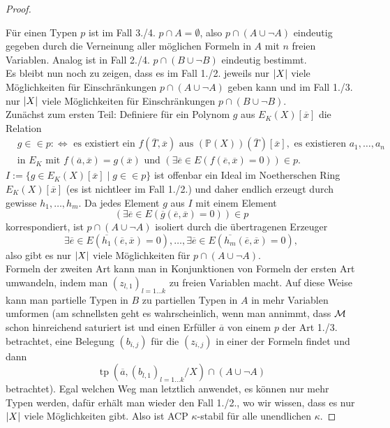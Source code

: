 \begin{proof}
\begin{enumerate}
	\end{enumerate}\newpage
	Für einen Typen $p$ ist im Fall 3./4. $p\cap A=\emptyset$, also $p\cap(A\cup\neg A)$ eindeutig gegeben durch die Verneinung aller möglichen Formeln in $A$ mit $n$ freien Variablen. Analog ist in Fall 2./4. $p\cap(B\cup\neg B)$ eindeutig bestimmt.\\
	Es bleibt nun noch zu zeigen, dass es im Fall 1./2. jeweils nur ${\left| X \right|}$ viele Möglichkeiten für Einschränkungen $p\cap(A\cup\neg A)$ geben kann und im Fall 1./3. nur ${\left| X \right|}$ viele Möglichkeiten für Einschränkungen $p\cap(B\cup\neg B)$.\\
	Zunächst zum ersten Teil: Definiere für ein Polynom $g$ aus $E_K(X)[\overline{x}]$ die Relation
	\begin{align*}&g\in\in p:\Leftrightarrow\text{ es existiert ein }f(\overline{T},\overline{x})\text{ aus }(\mathbb{P}(X))(\overline{T})[\overline{x}],\text{ es existieren }a_1,\dots,a_n\\
	&\text{in }E_K\text{ mit }f(\overline{a},\overline{x})=g(\overline{x})\text{ und }\left(\exists\overline{e}\in E(f(\overline{e},\overline{x})=0)\right)\in p.
	\end{align*}
	$I:=\{g\in E_K(X)[\overline{x}]\mid g\in\in p\}$ ist offenbar ein Ideal im Noetherschen Ring $E_K(X)[\overline{x}]$ (es ist nichtleer im Fall 1./2.) und daher endlich erzeugt durch gewisse $h_1,\dots,h_m$. Da jedes Element $g$ aus $I$ mit einem Element $$\left(\exists\overline{e}\in E(\overline{g}(\overline{e},\overline{x})=0)\right)\in p$$ korrespondiert, ist $p\cap(A\cup\neg A)$ isoliert durch die übertragenen Erzeuger $$\exists\overline{e}\in E(\overline{h_1}(\overline{e},\overline{x})=0),\dots,\exists\overline{e}\in E(\overline{h_m}(\overline{e},\overline{x})=0),$$ also gibt es nur ${\left| X \right|}$ viele Möglichkeiten für $p\cap(A\cup\neg A)$.\\
	Formeln der zweiten Art kann man in Konjunktionen von Formeln der ersten Art umwandeln, indem man $(z_{l,1})_{l=1\dots k}$ zu freien Variablen macht. Auf diese Weise kann man partielle Typen in $B$ zu partiellen Typen in $A$ in mehr Variablen umformen (am schnellsten geht es wahrscheinlich, wenn man annimmt, dass $\mathcal{M}$ schon hinreichend saturiert ist und einen Erfüller $\overline{a}$ von einem $p$ der Art 1./3. betrachtet, eine Belegung $(b_{i,j})$ für die $(z_{i,j})$ in einer der Formeln findet und dann $$\operatorname{tp}(\overline{a},(b_{l,1})_{l=1\dots k}/X)\cap(A\cup\neg A)$$ betrachtet). Egal welchen Weg man letztlich anwendet, es können nur mehr Typen werden, dafür erhält man wieder den Fall 1./2., wo wir wissen, dass es nur ${\left| X \right|}$ viele Möglichkeiten gibt. Also ist ACP $\kappa$-stabil für alle unendlichen $\kappa$.
\end{proof}
